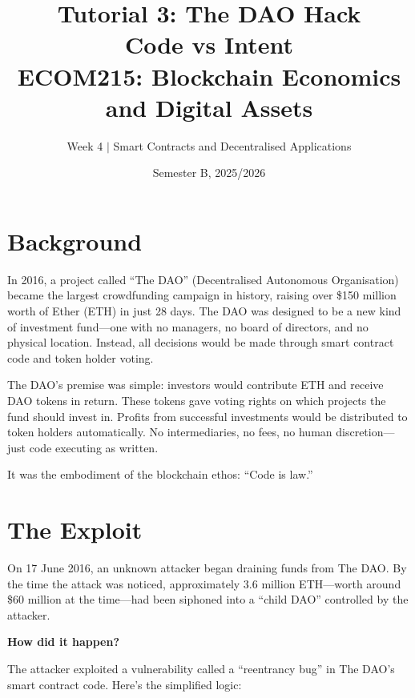 \documentclass[11pt]{article}
\title{Tutorial 3: The DAO Hack\\[0.3em] \Large Code vs Intent\\[1em] \normalsize ECOM215: Blockchain Economics and Digital Assets}
\author{Week 4 $\vert$ Smart Contracts and Decentralised Applications}
\date{Semester B, 2025/2026}
\begin{document}
\maketitle

\vspace{1em}
\begin{center}
\end{center}

\section*{Background}

In 2016, a project called ``The DAO'' (Decentralised Autonomous Organisation) became the largest crowdfunding campaign in history, raising over \$150 million worth of Ether (ETH) in just 28 days. The DAO was designed to be a new kind of investment fund---one with no managers, no board of directors, and no physical location. Instead, all decisions would be made through smart contract code and token holder voting.

The DAO's premise was simple: investors would contribute ETH and receive DAO tokens in return. These tokens gave voting rights on which projects the fund should invest in. Profits from successful investments would be distributed to token holders automatically. No intermediaries, no fees, no human discretion---just code executing as written.

It was the embodiment of the blockchain ethos: ``Code is law.''

\section*{The Exploit}

On 17 June 2016, an unknown attacker began draining funds from The DAO. By the time the attack was noticed, approximately 3.6 million ETH---worth around \$60 million at the time---had been siphoned into a ``child DAO'' controlled by the attacker.

\medskip
\noindent\textbf{How did it happen?}

The attacker exploited a vulnerability called a ``reentrancy bug'' in The DAO's smart contract code. Here's the simplified logic:
\end{document}
